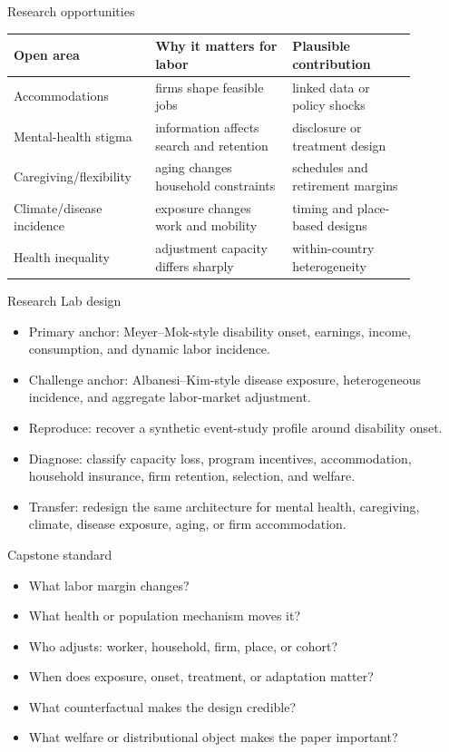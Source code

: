 \documentclass[aspectratio=169,11pt]{beamer}
\begin{document}
\begin{frame}{Research opportunities}
\small
\begin{tabular}{p{0.29\linewidth} p{0.31\linewidth} p{0.28\linewidth}}
\toprule
Open area & Why it matters for labor & Plausible contribution \\
\midrule
Accommodations & firms shape feasible jobs & linked data or policy shocks \\
Mental-health stigma & information affects search and retention & disclosure or treatment design \\
Caregiving/flexibility & aging changes household constraints & schedules and retirement margins \\
Climate/disease incidence & exposure changes work and mobility & timing and place-based designs \\
Health inequality & adjustment capacity differs sharply & within-country heterogeneity \\
\bottomrule
\end{tabular}
\end{frame}

\begin{frame}{Research Lab design}
\begin{itemize}
    \item Primary anchor: Meyer--Mok-style disability onset, earnings, income, consumption, and dynamic labor incidence.
    \item Challenge anchor: Albanesi--Kim-style disease exposure, heterogeneous incidence, and aggregate labor-market adjustment.
    \item Reproduce: recover a synthetic event-study profile around disability onset.
    \item Diagnose: classify capacity loss, program incentives, accommodation, household insurance, firm retention, selection, and welfare.
    \item Transfer: redesign the same architecture for mental health, caregiving, climate, disease exposure, aging, or firm accommodation.
\end{itemize}
\end{frame}

\begin{frame}{Capstone standard}
\begin{itemize}
    \item What labor margin changes?
    \item What health or population mechanism moves it?
    \item Who adjusts: worker, household, firm, place, or cohort?
    \item When does exposure, onset, treatment, or adaptation matter?
    \item What counterfactual makes the design credible?
    \item What welfare or distributional object makes the paper important?
\end{itemize}
\end{frame}
\end{document}
